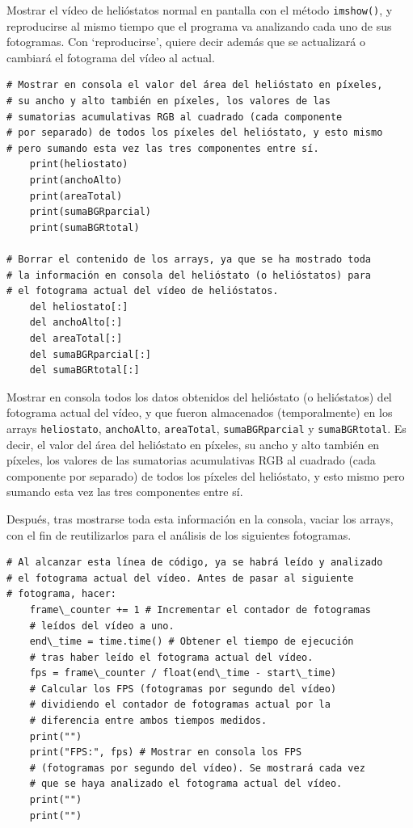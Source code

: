 Mostrar el vídeo de helióstatos normal en pantalla con el método \verb|imshow()|, y reproducirse al mismo tiempo que el programa va analizando cada uno de sus fotogramas. Con ‘reproducirse’, quiere decir además que se actualizará o cambiará el fotograma del vídeo al actual.

\begin{lstlisting}
# Mostrar en consola el valor del área del helióstato en píxeles,
# su ancho y alto también en píxeles, los valores de las
# sumatorias acumulativas RGB al cuadrado (cada componente
# por separado) de todos los píxeles del helióstato, y esto mismo
# pero sumando esta vez las tres componentes entre sí.
    print(heliostato)
    print(anchoAlto)
    print(areaTotal)
    print(sumaBGRparcial)
    print(sumaBGRtotal)

# Borrar el contenido de los arrays, ya que se ha mostrado toda
# la información en consola del helióstato (o helióstatos) para
# el fotograma actual del vídeo de helióstatos.
    del heliostato[:]
    del anchoAlto[:]
    del areaTotal[:]
    del sumaBGRparcial[:]
    del sumaBGRtotal[:]
\end{lstlisting}
    
Mostrar en consola todos los datos obtenidos del helióstato (o helióstatos) del fotograma actual del vídeo, y que fueron almacenados (temporalmente) en los arrays \verb|heliostato|, \verb|anchoAlto|, \verb|areaTotal|, \verb|sumaBGRparcial| y \verb|sumaBGRtotal|. Es decir, el valor del área del helióstato en píxeles, su ancho y alto también en píxeles, los valores de las sumatorias acumulativas RGB al cuadrado (cada componente por separado) de todos los píxeles del helióstato, y esto mismo pero sumando esta vez las tres componentes entre sí.

Después, tras mostrarse toda esta información en la consola, vaciar los arrays, con el fin de reutilizarlos para el análisis de los siguientes fotogramas.

\begin{lstlisting}
# Al alcanzar esta línea de código, ya se habrá leído y analizado
# el fotograma actual del vídeo. Antes de pasar al siguiente
# fotograma, hacer:
    frame\_counter += 1 # Incrementar el contador de fotogramas
    # leídos del vídeo a uno.
    end\_time = time.time() # Obtener el tiempo de ejecución
    # tras haber leído el fotograma actual del vídeo.
    fps = frame\_counter / float(end\_time - start\_time)
    # Calcular los FPS (fotogramas por segundo del vídeo)
    # dividiendo el contador de fotogramas actual por la
    # diferencia entre ambos tiempos medidos.
    print("")
    print("FPS:", fps) # Mostrar en consola los FPS
    # (fotogramas por segundo del vídeo). Se mostrará cada vez
    # que se haya analizado el fotograma actual del vídeo.
    print("")
    print("")
\end{lstlisting}

